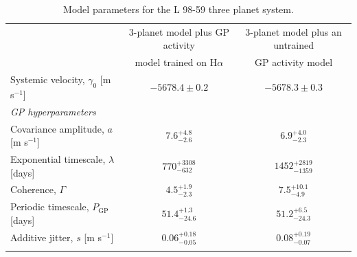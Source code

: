 \documentclass[longauth]{aa}
\newcommand{\mps}{m s$^{-1}$}
\begin{document}
\begin{table}[t]
  \caption{Model parameters for the L 98-59 three planet system.}
  \label{tab:results}
  \centering
  \small
  \begin{tabular}{lcc}  
    \hline\noalign{\smallskip}
    & 3-planet model plus GP activity & 3-planet model plus an untrained \\
    & model trained on H$\alpha$ & GP activity model \\
    \hline\noalign{\smallskip}
    Systemic velocity, $\gamma_0$ [\mps{]} & $-5678.4\pm 0.2$ & $-5678.3\pm 0.3$ \\
    \noalign{\smallskip}
    
    \emph{GP hyperparameters} && \\
    \noalign{\smallskip}
    Covariance amplitude, $a$ [\mps{]} & $7.6^{+4.8}_{-2.6}$ & $6.9^{+4.0}_{-2.3}$ \\
    \noalign{\smallskip}
    Exponential timescale, $\lambda$ [days] & $770^{+3308}_{-632}$ & $1452^{+2819}_{-1359}$ \\
    \noalign{\smallskip}
    Coherence, $\Gamma$ & $4.5^{+1.9}_{-2.3}$ & $7.5^{+10.1}_{-4.9}$ \\
    \noalign{\smallskip}
    Periodic timescale, $P_{\text{GP}}$ [days] & $51.4^{+1.3}_{-24.6}$ & $51.2^{+6.5}_{-24.3}$ \\
    \noalign{\smallskip}
    Additive jitter, $s$ [\mps{]} & $0.06^{+0.18}_{-0.05}$ & $0.08^{+0.19}_{-0.07}$ \\
    \noalign{\smallskip}
    \hline
    \noalign{\smallskip}
    

\end{tabular}
\end{table}
\end{document}
